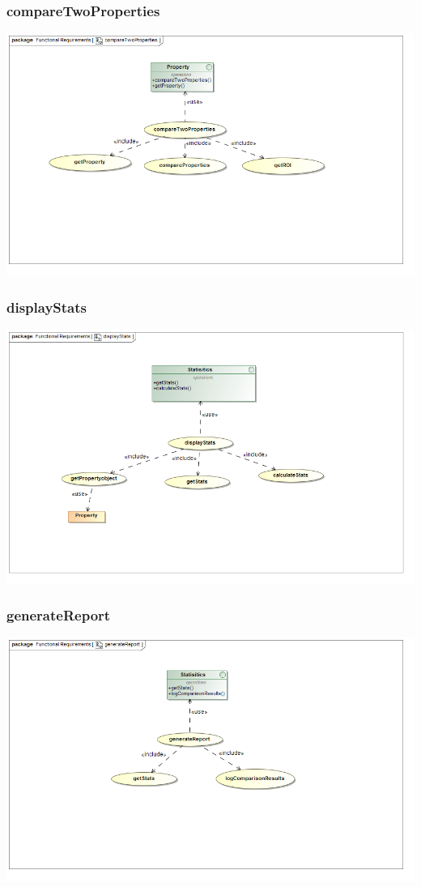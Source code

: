 \documentclass[a4paper,12pt]{article}
\begin{document}
\subsubsection{compareTwoProperties}
\includegraphics[width=1\textwidth]{./Images/requiredFunctionality/compareTwoProperties.png}
\subsubsection{displayStats}
\includegraphics[width=1\textwidth]{./Images/requiredFunctionality/displayStats.png}
\subsubsection{generateReport}
\includegraphics[width=1\textwidth]{./Images/requiredFunctionality/generateReport.png}
\end{document}
